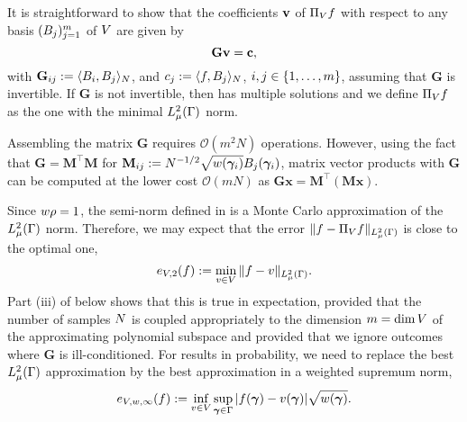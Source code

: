 It is straightforward to show that the coefficients $\mathbf{v}$ of $\Pi_{V}f$ with respect to any basis $(B_j)_{j=1}^{m}$ of $V$ are given by
\begin{equation}
\label{eq:dpls:computation}
	\mathbf{G}\mathbf{v}=\mathbf{c},
\end{equation}
with $\mathbf{G}_{ij}:=\langle B_i,B_j\rangle_{N}$, and $c_j:=\langle f,B_j\rangle_{N}$, $i,j\in\{1,\dots,m\}$, assuming that $\mathbf{G}$ is invertible. If $\mathbf{G}$ is not invertible, then  has multiple solutions and we define $\Pi_{V}f$ as the one with the minimal $L^2_{\mu}(\Gamma)$ norm. 
\begin{rem}
	\label{rem:matvec}
	Assembling the matrix $\mathbf{G}$ requires $\mathcal{O}(m^2N)$ operations. However, using the fact that $\mathbf{G}=\mathbf{M}^{\top}\mathbf{M}$ for $\mathbf{M}_{ij}:=N^{-1/2}\sqrt{w(\bm{\gamma}_i)}B_j(\bm{\gamma}_i)$, matrix vector products with $\mathbf{G}$ can be computed at the lower cost $\mathcal{O}(mN)$ as $\mathbf{G}\mathbf{x}=\mathbf{M}^{\top}(\mathbf{M}\mathbf{x})$. 
\end{rem}

Since $w\rho=1$, the semi-norm defined in  is a Monte Carlo approximation of the $L^2_{\mu}(\Gamma)$ norm. Therefore, we may expect that the error $\|f-\Pi_{V}f\|_{L^2_{\mu}(\Gamma)}$ is close to the optimal one,
\begin{equation}\label{eq:best2}
e_{V,2}(f):=\min_{v\in V}\|f-v\|_{L^2_{\mu}(\Gamma)}.
\end{equation}
Part (iii) of  below shows that this is true in expectation, provided that the number of samples $N$ is coupled appropriately to the dimension $m=\dim V$ of the approximating polynomial subspace and provided that we ignore outcomes where $\mathbf{G}$ is ill-conditioned.  For results in probability, we need to replace the best $L^2_{\mu}(\Gamma)$ approximation by the best approximation in a weighted supremum norm,
\begin{equation}
\label{eq:bestlinf}
e_{V,w,\infty}(f):=\inf_{v\in V}\sup_{\bm{\gamma}\in\Gamma}|f(\bm{\gamma})-v(\bm{\gamma})|\sqrt{w(\bm{\gamma})}.
\end{equation}

